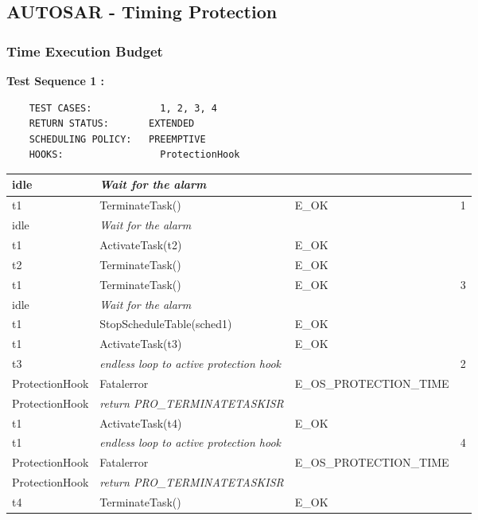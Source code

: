 \documentclass[10pt]{article}
\newlength{\Li}\settowidth{\Li}{Running}
\newlength{\Lii}\setlength{\Lii}{7cm}
\newlength{\Liiii}\setlength{\Liiii}{0.9cm}
\newlength{\Liii}\setlength{\Liii}{\textwidth} \addtolength{\Liii}{-\Li} \addtolength{\Liii}{-\Lii} \addtolength{\Liii}{-\Liiii}
\begin{document}
\subsection{AUTOSAR - Timing Protection}
\subsubsection{Time Execution Budget}

	\textbf{Test Sequence 1 :}
	\begin{lstlisting}
	TEST CASES:		       1, 2, 3, 4
	RETURN STATUS:	  	 EXTENDED
	SCHEDULING POLICY:   PREEMPTIVE
	HOOKS:		           ProtectionHook
	\end{lstlisting}
	

	\begin{supertabular}{|p{\Li}|p{\Lii}|p{\Liii}|p{\Liiii}|} \hline 
	idle	& \textit{Wait for the alarm}							& 										& \\ \hline
	t1	& TerminateTask()							& E\_OK											& 1 \\ \hline
	idle	& \textit{Wait for the alarm}							& 										& \\ \hline
	t1	& ActivateTask(t2)							& E\_OK											& \\ \hline
	t2	& TerminateTask()							& E\_OK											& \\ \hline
	t1	& TerminateTask()							& E\_OK											& 3 \\ \hline
	idle	& \textit{Wait for the alarm}							& 										& \\ \hline
	t1	& StopScheduleTable(sched1)					& E\_OK											& \\ \hline
	t1	& ActivateTask(t3)							& E\_OK											& \\ \hline
	t3	& \textit{endless loop to active protection hook}		& 												& 2 \\ \hline
	ProtectionHook		& Fatalerror					& E\_OS\_PROTECTION\_TIME 						& \\ \hline
	ProtectionHook		& \textit{return PRO\_TERMINATETASKISR}	& & \\ \hline
	t1	& ActivateTask(t4)							& E\_OK											& \\ \hline
	t1	& \textit{endless loop to active protection hook}		& 												& 4 \\ \hline
	ProtectionHook		& Fatalerror					& E\_OS\_PROTECTION\_TIME 						& \\ \hline
	ProtectionHook		& \textit{return PRO\_TERMINATETASKISR}	& & \\ \hline
	t4	& TerminateTask()							& E\_OK											& \\ \hline
	\end{supertabular}\\
\end{document}
